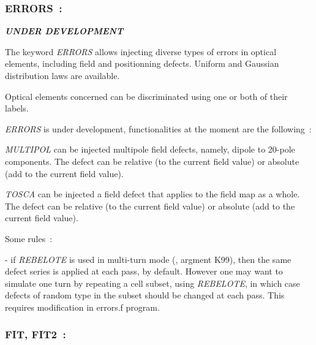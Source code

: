 \newpage

\subsubsection{ERRORS~:  \ERRORSTitl}  \label{ERRORS}   

\medskip 

{\bf \it  UNDER DEVELOPMENT}

\bigskip

 \noindent The keyword \textsl{ERRORS} allows injecting diverse types of errors in optical elements, 
including field and positionning defects. Uniform and Gaussian distribution laws are available. 

\medskip 

\noindent Optical elements concerned can be discriminated using one or both of their labels.

\medskip 

 \noindent \textsl{ERRORS}  is under development, functionalities at the moment are the following~: 

\medskip 

\noindent  \textsl{MULTIPOL} can be injected multipole field defects, namely, dipole to 20-pole components.
The defect can be relative (to the current field value) or absolute (add to the current field value). 

\medskip 

\noindent  \textsl{TOSCA} can be injected a field defect that applies to the field map as a whole. 
The defect can be relative (to the current field value) or absolute (add to the current field value). 


\bigskip

\noindent Some rules~: 

- if \textsl{REBELOTE} is used in multi-turn mode (\ie, argment K99), then the same defect series is 
applied at each pass, by default. However one may want to simulate one turn by repeating a cell subset, using 
\textsl{REBELOTE}, in which case  defects of random type in the subset should be changed at each pass. This 
requires modification in errors.f program.






\newpage

\subsubsection{FIT, FIT2~:  \FITTitl}  \label{FIT}   
\medskip

